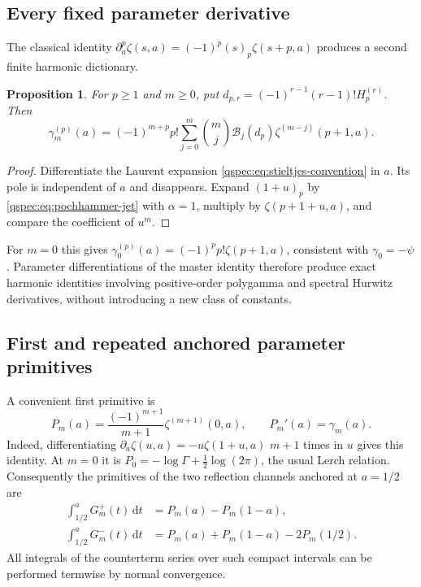 \documentclass[11pt,letterpaper]{article}
\numberwithin{equation}{section}
\newtheorem{proposition}[theorem]{Proposition}
\theoremstyle{definition}
\newcommand{\dd}{\,\mathrm{d}}
\newcommand{\Bcal}{\mathcal B}
\begin{document}
\subsection{Every fixed parameter derivative}
The classical identity
$\partial_a^p\zeta(s,a)=(-1)^p(s)_p\zeta(s+p,a)$ \cite{hurwitz}
produces a second finite harmonic dictionary.

\begin{proposition}\label{qspec:prop:parameter-derivatives}
For $p\ge1$ and $m\ge0$, put
$d_{p,r}=(-1)^{r-1}(r-1)!H_p^{(r)}$. Then
\begin{equation}\label{qspec:eq:stieltjes-derivative}
\gamma_m^{(p)}(a)=(-1)^{m+p}p!
\sum_{j=0}^m\binom mj\Bcal_j(d_p)
\zeta^{(m-j)}(p+1,a).
\end{equation}
\end{proposition}
\begin{proof}
Differentiate the Laurent expansion
\eqref{qspec:eq:stieltjes-convention} in $a$. Its pole is independent of
$a$ and disappears. Expand $(1+u)_p$ by
\eqref{qspec:eq:pochhammer-jet} with $\alpha=1$, multiply by
$\zeta(p+1+u,a)$, and compare the coefficient of $u^m$.
\end{proof}
For $m=0$ this gives $\gamma_0^{(p)}(a)=(-1)^pp!\zeta(p+1,a)$,
consistent with $\gamma_0=-\psi$. Parameter differentiations of the
master identity therefore produce exact harmonic identities involving
positive-order polygamma and spectral Hurwitz derivatives, without
introducing a new class of constants.

\subsection{First and repeated anchored parameter primitives}
A convenient first primitive is
\begin{equation}\label{qspec:eq:Pprimitive}
P_m(a)=\frac{(-1)^{m+1}}{m+1}\zeta^{(m+1)}(0,a),
\qquad P_m'(a)=\gamma_m(a).
\end{equation}
Indeed, differentiating $\partial_a\zeta(u,a)=-u\zeta(1+u,a)$
$m+1$ times in $u$ gives this identity. At $m=0$ it is
$P_0=-\log\Gamma+\tfrac12\log(2\pi)$, the usual Lerch relation.
Consequently the primitives of the two reflection channels anchored at
$a=1/2$ are
\begin{align}
\int_{1/2}^a G_m^+(t)\dd t&=P_m(a)-P_m(1-a),\label{qspec:eq:plus-primitive}\\
\int_{1/2}^a G_m^-(t)\dd t&=P_m(a)+P_m(1-a)-2P_m(1/2).
\label{qspec:eq:minus-primitive}
\end{align}
All integrals of the counterterm series over such compact intervals can
be performed termwise by normal convergence.
\end{document}
